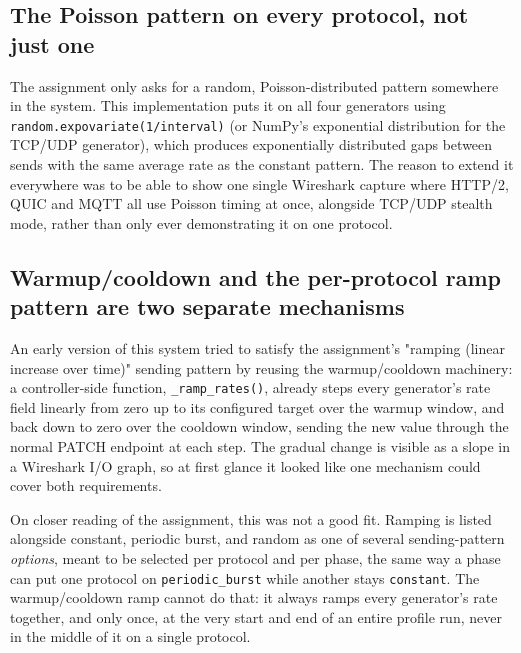 \subsection{The Poisson pattern on every protocol, not just one}

The assignment only asks for a random, Poisson-distributed pattern somewhere
in the system. This implementation puts it on all four generators using
\texttt{random.expovariate(1/interval)} (or NumPy's exponential distribution
for the TCP/UDP generator), which produces exponentially distributed gaps
between sends with the same average rate as the constant pattern. The reason
to extend it everywhere was to be able to show one single Wireshark capture
where HTTP/2, QUIC and MQTT all use Poisson timing at once, alongside TCP/UDP
stealth mode, rather than only ever demonstrating it on one protocol.

\subsection{Warmup/cooldown and the per-protocol ramp pattern are two separate mechanisms}

An early version of this system tried to satisfy the assignment's "ramping
(linear increase over time)" sending pattern by reusing the warmup/cooldown
machinery: a controller-side function, \texttt{\_ramp\_rates()}, already
steps every generator's rate field linearly from zero up to its configured
target over the warmup window, and back down to zero over the cooldown
window, sending the new value through the normal PATCH endpoint at each
step. The gradual change is visible as a slope in a Wireshark I/O graph, so
at first glance it looked like one mechanism could cover both requirements.

On closer reading of the assignment, this was not a good fit. Ramping is
listed alongside constant, periodic burst, and random as one of several
sending-pattern \emph{options}, meant to be selected per protocol and per
phase, the same way a phase can put one protocol on \texttt{periodic\_burst}
while another stays \texttt{constant}. The warmup/cooldown ramp cannot do
that: it always ramps every generator's rate together, and only once, at the
very start and end of an entire profile run, never in the middle of it on a
single protocol.


